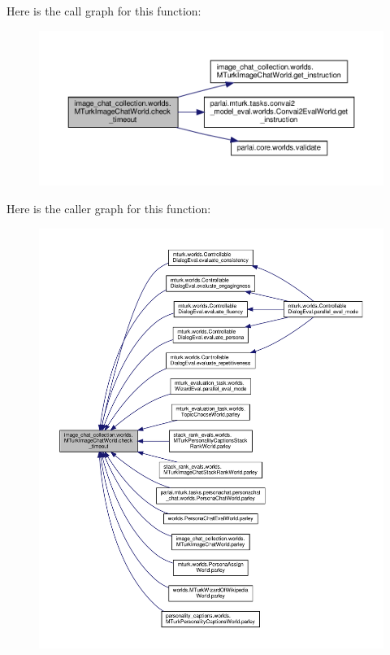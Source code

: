 Here is the call graph for this function\+:
\nopagebreak
\begin{figure}[H]
\begin{center}
\leavevmode
\includegraphics[width=350pt]{classimage__chat__collection_1_1worlds_1_1MTurkImageChatWorld_a333c8d7353ed7fba417461177035c209_cgraph}
\end{center}
\end{figure}
Here is the caller graph for this function\+:
\nopagebreak
\begin{figure}[H]
\begin{center}
\leavevmode
\includegraphics[width=350pt]{classimage__chat__collection_1_1worlds_1_1MTurkImageChatWorld_a333c8d7353ed7fba417461177035c209_icgraph}
\end{center}
\end{figure}
\mbox{\label{classimage__chat__collection_1_1worlds_1_1MTurkImageChatWorld_a27c215716de1649559eca384ed71d0f8}} 
